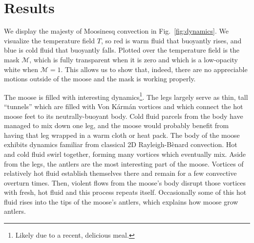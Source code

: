 \section{Results}
\label{sec:results}

We display the majesty of Moosinesq convection in Fig.~\ref{fig:dynamics}.
We visualize the temperature field $T$, so red is warm fluid that buoyantly rises, and blue is cold fluid that buoyantly falls.
Plotted over the temperature field is the mask $\mathcal{M}$, which is fully transparent when it is zero and which is a low-opacity white when $\mathcal{M} = 1$.
This allows us to show that, indeed, there are no appreciable motions outside of the moose and the mask is working properly.

The moose is filled with interesting dynamics\footnote{Likely due to a recent, delicious meal.}.
The legs largely serve as thin, tall ``tunnels'' which are filled with Von K\'{a}rm\'{a}n vortices and which connect the hot moose feet to its neutrally-buoyant body.
Cold fluid parcels from the body have managed to mix down one leg, and the moose would probably benefit from having that leg wrapped in a warm cloth or heat pack.
The body of the moose exhibits dynamics familiar from classical 2D Rayleigh-B\`{e}nard convection.
Hot and cold fluid swirl together, forming many vortices which eventually mix.
Aside from the legs, the antlers are the most interesting part of the moose.
Vortices of relatively hot fluid establish themselves there and remain for a few convective overturn times.
Then, violent flows from the moose's body disrupt those vortices with fresh, hot fluid and this process repeats itself.
Occasionally some of this hot fluid rises into the tips of the moose's antlers, which explains how moose grow antlers.

